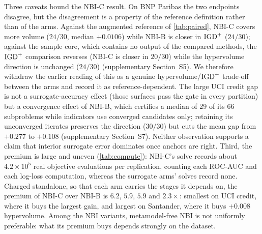 Three caveats bound the NBI-C result. On BNP Paribas the two endpoints disagree, but the disagreement is a property of
the reference definition rather than of the arms. Against the augmented reference of \cref{tab:paired}, NBI-C covers
more volume ($24/30$, median $+0.0106$) while NBI-B is closer in $\mathrm{IGD}^{+}$ ($24/30$); against the sample core, which
contains no output of the compared methods, the $\mathrm{IGD}^{+}$ comparison reverses (NBI-C is closer in $20/30$) while the
hypervolume direction is
unchanged ($24/30$) (supplementary Section~S5). We therefore withdraw the earlier reading of this as a genuine
hypervolume/$\mathrm{IGD}^{+}$ trade-off between the arms and record it as reference-dependent. The large UCI credit gap is not a
surrogate-accuracy effect (those surfaces pass the gate in every partition) but a convergence effect of NBI-B,
which certifies a median of 29 of its 66 subproblems while indicators use converged candidates only; retaining its
unconverged iterates preserves the direction ($30/30$) but cuts the mean gap from $+0.277$ to $+0.108$ (supplementary
Section~S7). Neither observation supports a claim that interior surrogate error dominates once anchors are right.
Third, the premium is large and uneven (\cref{tab:compute}): NBI-C's solve records about $4.2\times10^{5}$ real
objective evaluations per replication, counting each ROC-AUC and each log-loss computation, whereas the surrogate
arms' solves record none. Charged standalone, so that each arm carries the stages it depends on, the premium of NBI-C
over NBI-B is $6.2$, $5.9$, $5.9$ and $2.3\times$: smallest on UCI credit, where it buys the largest gain, and largest on
Santander, where it buys $+0.008$ hypervolume. Among the NBI variants, metamodel-free NBI is not
uniformly preferable: what its premium buys depends strongly on the dataset.




